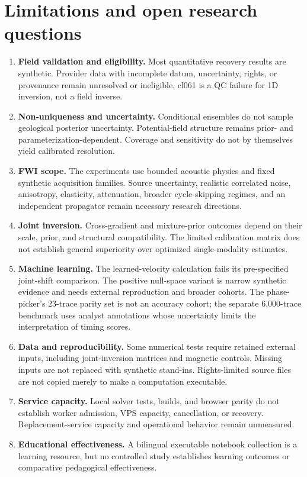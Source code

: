 \section{Limitations and open research
questions}\label{limitations-and-open-research-questions}

\begin{enumerate}
\def\labelenumi{\arabic{enumi}.}
\tightlist
\item
  \textbf{Field validation and eligibility.} Most quantitative recovery
  results are synthetic. Provider data with incomplete datum,
  uncertainty, rights, or provenance remain unresolved or ineligible.
  cl061 is a QC failure for 1D inversion, not a field inverse.
\item
  \textbf{Non-uniqueness and uncertainty.} Conditional ensembles do not
  sample geological posterior uncertainty. Potential-field structure
  remains prior- and parameterization-dependent. Coverage and
  sensitivity do not by themselves yield calibrated resolution.
\item
  \textbf{FWI scope.} The experiments use bounded acoustic physics and
  fixed synthetic acquisition families. Source uncertainty, realistic
  correlated noise, anisotropy, elasticity, attenuation, broader
  cycle-skipping regimes, and an independent propagator remain necessary
  research directions.
\item
  \textbf{Joint inversion.} Cross-gradient and mixture-prior outcomes
  depend on their scale, prior, and structural compatibility. The
  limited calibration matrix does not establish general superiority over
  optimized single-modality estimates.
\item
  \textbf{Machine learning.} The learned-velocity calculation fails
  its pre-specified joint-shift comparison. The positive null-space
  variant is narrow synthetic evidence and needs external reproduction
  and broader cohorts. The phase-picker's 23-trace parity set is not an
  accuracy cohort; the separate 6,000-trace benchmark uses analyst
  annotations whose uncertainty limits the interpretation of timing
  scores.
\item
  \textbf{Data and reproducibility.} Some numerical tests require
  retained external inputs, including joint-inversion matrices and
  magnetic controls. Missing inputs are not replaced with synthetic
  stand-ins. Rights-limited source files are not copied merely to make a
  computation executable.
\item
  \textbf{Service capacity.} Local solver tests, builds, and browser
  parity do not establish worker admission, VPS capacity, cancellation,
  or recovery. Replacement-service capacity and operational behavior
  remain unmeasured.
\item
  \textbf{Educational effectiveness.} A bilingual executable notebook
  collection is a learning resource, but no controlled study establishes
  learning outcomes or comparative pedagogical effectiveness.
\end{enumerate}

